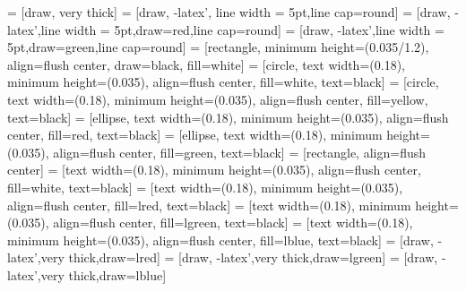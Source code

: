\usepackage{transparent}
\usepackage{background}
\usepackage{helvet}
\renewcommand*\familydefault{\sfdefault} %
\usepackage[T1]{fontenc}
\usepackage[numbers]{natbib}
\usepackage{calc}
\usepackage[english]{babel}
\usepackage{color}
\usepackage{multicol}
\usepackage{graphicx}
\usepackage[papername=a0paper, left = 1.5cm, right = 1.5cm, top = 1.5cm, bottom = 1.5cm]{geometry}
\usepackage{titlesec}
\usepackage{subfig}
\usepackage{tikz}
\usetikzlibrary{shapes,arrows,positioning}

\def \vs {\vspace{10pt}}
\def \vms {\vspace{-10pt}}
\def \vbs {\vs\vs}
\def \dist {3.5}
\def \bwidth {0.18\textwidth}
\def \bheight {0.035\textheight}
\def \tfont {\fontsize{24}{29}\selectfont}
\def \ffont	{\fontsize{18}{21.6}\selectfont}
\def \lfont {\fontsize{18}{22}\selectfont}
\def \spacer {\vs\par\vfill}

 = [draw, very thick]
 = [draw, -latex', line width = 5pt,line cap=round]
 = [draw, -latex',line width = 5pt,draw=red,line cap=round]
 = [draw, -latex',line width = 5pt,draw=green,line cap=round]
 = [rectangle, minimum height=(\bheight/1.2), align=flush center, draw=black, fill=white]
 = [circle, text width=(\bwidth), minimum height=(\bheight), align=flush center, fill=white, text=black]
 = [circle, text width=(\bwidth), minimum height=(\bheight), align=flush center, fill=yellow, text=black]
 = [ellipse, text width=(\bwidth), minimum height=(\bheight), align=flush center, fill=red, text=black]
 = [ellipse, text width=(\bwidth), minimum height=(\bheight), align=flush center, fill=green, text=black]
 = [rectangle, align=flush center]
 = [text width=(\bwidth), minimum height=(\bheight), align=flush center, fill=white, text=black]
 = [text width=(\bwidth), minimum height=(\bheight), align=flush center, fill=lred, text=black]
 = [text width=(\bwidth), minimum height=(\bheight), align=flush center, fill=lgreen, text=black]
 = [text width=(\bwidth), minimum height=(\bheight), align=flush center, fill=lblue, text=black]
 = [draw, -latex',very thick,draw=lred]
 = [draw, -latex',very thick,draw=lgreen]
 = [draw, -latex',very thick,draw=lblue]


